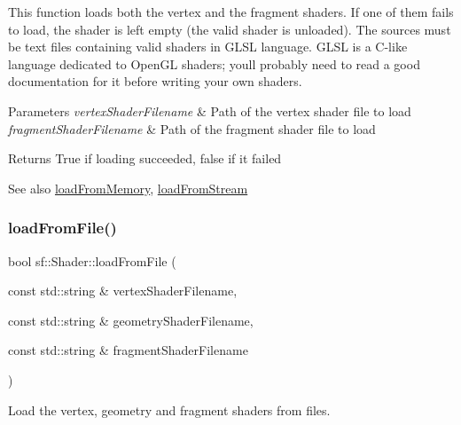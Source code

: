 This function loads both the vertex and the fragment shaders. If one of them fails to load, the shader is left empty (the valid shader is unloaded). The sources must be text files containing valid shaders in G\+L\+SL language. G\+L\+SL is a C-\/like language dedicated to Open\+GL shaders; you\textquotesingle{}ll probably need to read a good documentation for it before writing your own shaders.


\begin{DoxyParams}{Parameters}
{\em vertex\+Shader\+Filename} & Path of the vertex shader file to load \\
\hline
{\em fragment\+Shader\+Filename} & Path of the fragment shader file to load\\
\hline
\end{DoxyParams}
\begin{DoxyReturn}{Returns}
True if loading succeeded, false if it failed
\end{DoxyReturn}
\begin{DoxySeeAlso}{See also}
\mbox{\hyperlink{classsf_1_1_shader_ac92d46bf71dff2d791117e4e472148aa}{load\+From\+Memory}}, \mbox{\hyperlink{classsf_1_1_shader_a2ee1b130c0606e4f8bcdf65c1efc2a53}{load\+From\+Stream}} \begin{DoxyVerb}\end{DoxyVerb}
 
\end{DoxySeeAlso}
\mbox{\label{classsf_1_1_shader_a295d8468811ca15bf9c5401a7a7d4f54}} 
\subsubsection{\texorpdfstring{loadFromFile()}{loadFromFile()}\hspace{0.1cm}{\footnotesize\ttfamily [3/3]}}
{\footnotesize\ttfamily bool sf\+::\+Shader\+::load\+From\+File (\begin{DoxyParamCaption}\item[{const std\+::string \&}]{vertex\+Shader\+Filename,  }\item[{const std\+::string \&}]{geometry\+Shader\+Filename,  }\item[{const std\+::string \&}]{fragment\+Shader\+Filename }\end{DoxyParamCaption})}



Load the vertex, geometry and fragment shaders from files. 

